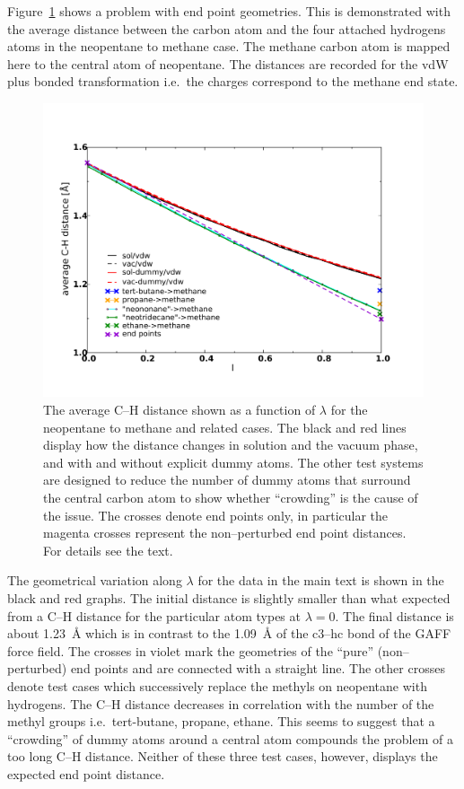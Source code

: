 \documentclass[journal=jctcce,manuscript=suppinfo]{achemso}
\begin{document}
Figure~\ref{fig:amber-dist} shows a problem with end point geometries.  This is demonstrated with the average distance between the
carbon atom and the four attached hydrogens atoms in the neopentane to
methane case.  The methane carbon atom is mapped here to the central atom
of neopentane.  The distances are recorded for the vdW plus bonded
transformation i.e.\ the charges correspond to the methane end state.
\begin{figure}[ht]
\includegraphics[scale=0.6]{figures/amber-dist.pdf}
\caption{The average C--H distance shown as a function of $\lambda$
  for the neopentane to methane and related cases.  The black and red
  lines display how the distance changes in solution and the
  vacuum phase, and with and without explicit dummy atoms.  The other test
  systems are designed to reduce the number of dummy atoms that
  surround the central carbon atom to show whether ``crowding'' is the
  cause of the issue.  The crosses denote end points only, in
  particular the magenta crosses represent the non--perturbed end
  point distances.  For details see the text.}
\label{fig:amber-dist}
\end{figure}

The geometrical variation along $\lambda$ for the data in the main
text is shown in the black and red graphs.  The initial distance is
slightly smaller than what expected from a C--H distance for the
particular atom types at $\lambda = 0$.  The final distance is about
\SI{1.23}{\angstrom} which is in contrast to the \SI{1.09}{\angstrom}
of the c3--hc bond of the GAFF force field.  The crosses in violet
mark the geometries of the ``pure'' (non--perturbed) end points and
are connected with a straight line.  The other crosses denote test
cases which successively replace the methyls on neopentane with
hydrogens.  The C--H distance decreases in correlation with the number
of the methyl groups i.e.\ tert-butane, propane, ethane.  This seems
to suggest that a ``crowding'' of dummy atoms around a central atom
compounds the problem of a too long C--H distance.  Neither of these
three test cases, however, displays the expected end point distance.
\end{document}
